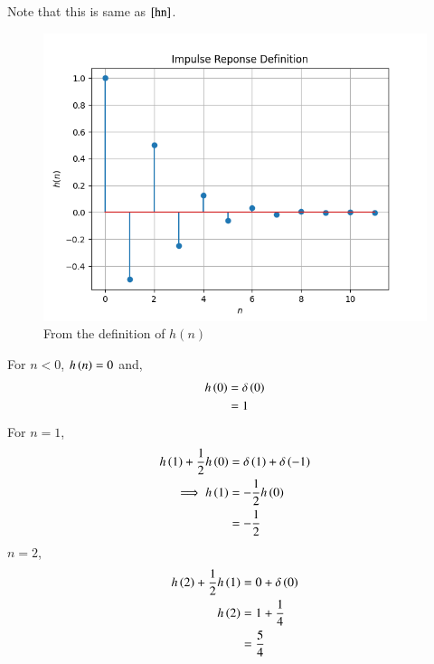 \documentclass[journal,12pt,twocolumn]{IEEEtran}
\renewcommand\thesection{\arabic{section}}
\begin{document}
\begin{enumerate}[label=\thesection.\arabic*]
\begin{lstlisting}
\end{lstlisting}
           Note that this is same as $\ref{hn}$.\\
           \begin{figure}[ht!]
                \centering
                \includegraphics[width = \columnwidth]{figs/hndef.png}
                \caption{From the definition of $h(n)$}
                \label{hndef}
           \end{figure}
           For $n <0$, $h\left(n\right) = 0$ and,
           \begin{align}
                h\left(0\right) & = \delta\left(0\right) \\
                          & = 1
           \end{align}
           For $n =1$,
           \begin{align}
                h\left(1\right) + \frac{1}{2}h\left(0\right) & = \delta\left(1\right) + \delta\left(-1\right) \\
                \implies  h\left(1\right)              & = -\frac{1}{2}h\left(0\right)            \\
                                                 & = -\frac{1}{2}
           \end{align}
           $n=2$,
           \begin{align}
                h\left(2\right) + \frac{1}{2}h\left(1\right) & = 0 + \delta\left(0\right) \\
                h\left(2\right)                        & = 1 + \frac{1}{4}    \\
                                                 & = \frac{5}{4}
           \end{align}

\end{enumerate}
\end{document}
